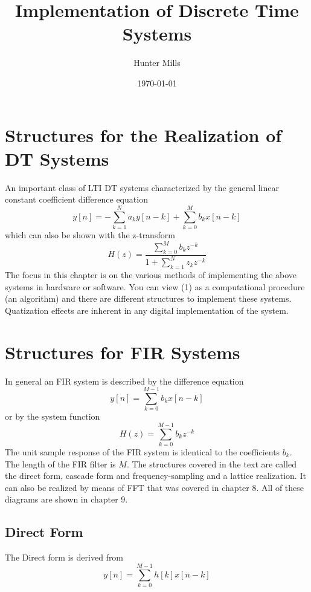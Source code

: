 \documentclass{article} %
\title{Implementation of Discrete Time Systems} %
\author{Hunter Mills} %
\date{\today} %
\begin{document}
    \maketitle %
    
    \section{Structures for the Realization of DT Systems} %
    An important class of LTI DT systems characterized by the general linear constant coefficient difference equation
    \begin{equation}
    y[n] = -\sum_{k=1}^Na_ky[n-k] + \sum_{k=0}^Mb_kx[n-k]
    \end{equation}
    which can also be shown with the z-transform
    \begin{equation}
    H(z) = \frac{\sum_{k=0}^Mb_kz^{-k}}{1 + \sum_{k=1}^Nz_kz^{-k}}
    \end{equation}
    The focus in this chapter is on the various methods of implementing the above systems in hardware or software. You can view (1) as a computational procedure (an algorithm) and there are different structures to implement these systems. Quatization effects are inherent in any digital implementation of the system. 
    
    \section{Structures for FIR Systems}
    In general an FIR system is described by the difference equation 
    \begin{equation}
    y[n] = \sum_{k=0}^{M-1}b_kx[n-k]
    \end{equation}
    or by the system function
    \begin{equation}
    H(z) = \sum_{k=0}^{M-1}b_kz^{-k}
    \end{equation}
	The unit sample response of the FIR system is identical to the coefficients $b_k$. The length of the FIR filter is $M$. The structures covered in the text are called the direct form, cascade form and frequency-sampling and a lattice realization. It can also be realized by means of FFT that was covered in chapter 8. All of these diagrams are shown in chapter 9.
	
	\subsection{Direct Form}
	The Direct form is derived from 
	\begin{equation}
	y[n] = \sum_{k=0}^{M-1}h[k]x[n-k]
	\end{equation}
	
\end{document}
